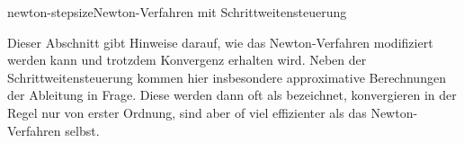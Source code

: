 \begin{Algorithmus*}{newton-stepsize}{Newton-Verfahren mit Schrittweitensteuerung}
    
\end{Algorithmus*}

\begin{remark}
  Dieser Abschnitt gibt Hinweise darauf, wie das Newton-Verfahren
  modifiziert werden kann und trotzdem Konvergenz erhalten wird. Neben
  der Schrittweitensteuerung kommen hier insbesondere approximative
  Berechnungen der Ableitung in Frage. Diese werden dann oft als
   bezeichnet, konvergieren in der
  Regel nur von erster Ordnung, sind aber of viel effizienter als das
  Newton-Verfahren selbst.
\end{remark}

